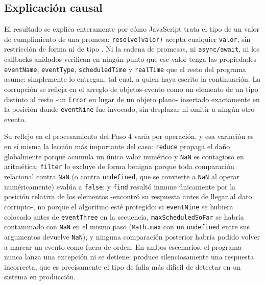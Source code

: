 \documentclass[conference,a4paper]{IEEEtran}
\begin{document}
\subsection{Explicaci\'on causal}
El resultado se explica enteramente por c\'omo JavaScript trata el tipo de un valor de cumplimiento de una promesa: \texttt{resolve(valor)} acepta cualquier \texttt{valor}, sin restricci\'on de forma ni de tipo \cite{ecma_promise}. Ni la cadena de promesas, ni \texttt{async/await}, ni los callbacks anidados verifican en ning\'un punto que ese valor tenga las propiedades \texttt{eventName}, \texttt{eventType}, \texttt{scheduledTime} y \texttt{realTime} que el resto del programa asume: simplemente lo entregan, tal cual, a quien haya escrito la continuaci\'on. La corrupci\'on se refleja en el arreglo de objetos-evento como un elemento de un tipo distinto al resto -un \texttt{Error} en lugar de un objeto plano- insertado exactamente en la posici\'on donde \texttt{eventNine} fue invocado, sin desplazar ni omitir a ning\'un otro evento.

Su reflejo en el procesamiento del Paso 4 var\'ia por operaci\'on, y esa variaci\'on es en s\'i misma la lecci\'on m\'as importante del caso: \texttt{reduce} propaga el da\~no globalmente porque acumula un \'unico valor num\'erico y \texttt{NaN} es contagioso en aritm\'etica; \texttt{filter} lo excluye de forma benigna porque toda comparaci\'on relacional contra \texttt{NaN} (o contra \texttt{undefined}, que se convierte a \texttt{NaN} al operar num\'ericamente) eval\'ua a \texttt{false}; y \texttt{find} result\'o inmune \'unicamente por la posici\'on relativa de los elementos -encontr\'o su respuesta antes de llegar al dato corrupto-, no porque el algoritmo est\'e protegido: si \texttt{eventNine} se hubiera colocado antes de \texttt{eventThree} en la secuencia, \texttt{maxScheduledSoFar} se habr\'ia contaminado con \texttt{NaN} en el mismo paso (\texttt{Math.max} con un \texttt{undefined} entre sus argumentos devuelve \texttt{NaN}), y ninguna comparaci\'on posterior habr\'ia podido volver a marcar un evento como fuera de orden. En ambos escenarios, el programa nunca lanza una excepci\'on ni se detiene: produce silenciosamente una respuesta incorrecta, que es precisamente el tipo de falla m\'as dif\'icil de detectar en un sistema en producci\'on.
\end{document}
